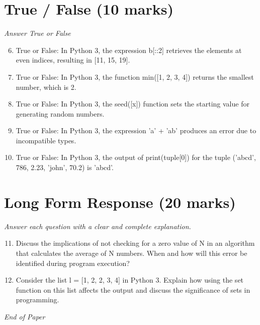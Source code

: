 \documentclass[12pt]{article}
\begin{document}
\section*{True / False (10 marks)}
\textit{Answer True or False}
\begin{enumerate}[label=\arabic*.]
\setcounter{enumi}{5}
\item True or False: In Python 3, the expression b[::2] retrieves the elements at even indices, resulting in [11, 15, 19].
\item True or False: In Python 3, the function min([1, 2, 3, 4]) returns the smallest number, which is 2.
\item True or False: In Python 3, the seed([x]) function sets the starting value for generating random numbers.
\item True or False: In Python 3, the expression 'a' + 'ab' produces an error due to incompatible types.
\item True or False: In Python 3, the output of print(tuple[0]) for the tuple ('abcd', 786, 2.23, 'john', 70.2) is 'abcd'.
\end{enumerate}

\section*{Long Form Response (20 marks)}
\textit{Answer each question with a clear and complete explanation.}
\begin{enumerate}[label=\arabic*.]
\setcounter{enumi}{10}
\item Discuss the implications of not checking for a zero value of N in an algorithm that calculates the average of N numbers. When and how will this error be identified during program execution?
\item Consider the list l = [1, 2, 2, 3, 4] in Python 3. Explain how using the set function on this list affects the output and discuss the significance of sets in programming.
\end{enumerate}

\vfill
\noindent\textit{End of Paper}
\end{document}
